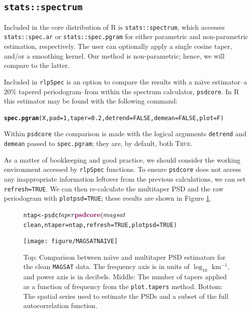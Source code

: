 \documentclass{article}\usepackage{graphicx, color}
\makeatletter
\newcommand{\hlfunctioncall}[1]{\textcolor[rgb]{0.501960784313725,0,0.329411764705882}{\textbf{#1}}}%
\newenvironment{kframe}{%
 \def\at@end@of@kframe{}%
 \ifinner\ifhmode%
  \def\at@end@of@kframe{\end{minipage}}%
  \begin{minipage}{\columnwidth}%
 \fi\fi%
 \def\FrameCommand##1{\hskip\@totalleftmargin \hskip-\fboxsep
 \colorbox{shadecolor}{##1}\hskip-\fboxsep
     \hskip-\linewidth \hskip-\@totalleftmargin \hskip\columnwidth}%
 \MakeFramed {\advance\hsize-\width
   \@totalleftmargin\z@ \linewidth\hsize
   \@setminipage}}%
 {\par\unskip\endMakeFramed%
 \at@end@of@kframe}
\newenvironment{knitrout}{}{} %
\newcommand{\SC}[1]{\textsc{#1}}
\newcommand{\Rcmd}[1]{\texttt{#1}}
\newcommand{\rlp}[0]{\Rcmd{rlpSpec}}
\newcommand{\naive}[0]{na\"{\i}ve}
\makeatother
\begin{document}
\subsection{\Rcmd{stats::spectrum}}

Included in the core distribution of R is \Rcmd{stats::spectrum}, which
accesses \Rcmd{stats::spec.ar} or \Rcmd{stats::spec.pgram} for either
parametric and non-parametric estimation, respectively.  
The user can optionally apply a single cosine taper, and/or a smoothing kernel.
Our method is non-parametric; hence, we will compare to the latter.

Included in \rlp{} is an option to compare the 
results with a \naive{} estimator--a 20\% tapered periodogram--from within the
spectrum calculator, \Rcmd{psdcore}.
In R this estimator may be found with the following command:
\begin{knitrout}
\color{fgcolor}\begin{kframe}
\begin{alltt}
\hlfunctioncall{spec.pgram}(X, pad = 1, taper = 0.2, detrend = FALSE, demean = FALSE, plot = F)
\end{alltt}
\end{kframe}
\end{knitrout}

Within \Rcmd{psdcore} the comparison is
made with
the logical arguments \Rcmd{detrend} and \Rcmd{demean} 
passed to \Rcmd{spec.pgram}; they are,
by default, both \SC{True}.

As a matter of bookkeeping and good practice, 
we should consider the working environment
accessed by \rlp{} functions.
To ensure
\Rcmd{psdcore} does not access any inappropriate information leftover
from the previous calculations, we
can set \Rcmd{refresh=TRUE}.
We can then
re-calculate the multitaper PSD and the
raw periodogram with \Rcmd{plotpsd=TRUE}; these
results are shown in Figure \ref{fig:two}.
%
\begin{figure}[htb!]
\begin{center}
\begin{knitrout}
\color{fgcolor}\begin{kframe}
\begin{alltt}
ntap <- psdc$taper
\hlfunctioncall{psdcore}(magsat$clean, ntaper = ntap, refresh = TRUE, plotpsd = TRUE)
\end{alltt}
\end{kframe}
\texttt{[image: figure/MAGSATNAIVE]} 

\end{knitrout}

\caption{Top: Comparison between \naive{} and multitaper PSD estimators for the 
clean \Rcmd{MAGSAT} data. The frequency axis is in units of $\log_{10}$ km$^{-1}$,
and power axis is in decibels.
Middle: The number of tapers applied as a function of frequency from
the \Rcmd{plot.tapers} method. 
Bottom: The spatial series used to estimate the PSDs and a subset
of the full autocorrelation function.}
\label{fig:two}
\end{center}
\end{figure}
\end{document}
